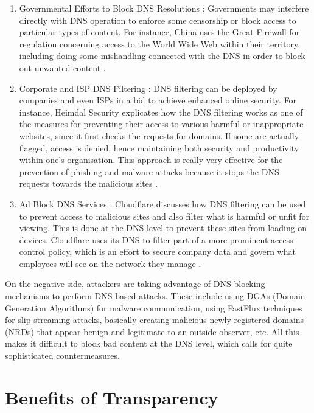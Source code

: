 \begin{enumerate}
    \item Governmental Efforts to Block DNS Resolutions : Governments may interfere directly with DNS operation to enforce some censorship or block access to particular types of content. For instance, China uses the Great Firewall for regulation concerning access to the World Wide Web within their territory, including doing some mishandling connected with the DNS in order to block out unwanted content \cite{XuAlbert2017MediaCensorship}.
    \item Corporate and ISP DNS Filtering : DNS filtering can be deployed by companies and even ISPs in a bid to achieve enhanced online security. For instance, Heimdal Security explicates how the DNS filtering works as one of the measures for preventing their access to various harmful or inappropriate websites, since it first checks the requests for domains. If some are actually flagged, access is denied, hence maintaining both security and productivity within one's organisation. This approach is really very effective for the prevention of phishing and malware attacks because it stops the DNS requests towards the malicious sites \cite{
HeimdalDNSSecurity2023}.
    \item Ad Block DNS Services : Cloudflare discusses how DNS filtering can be used to prevent access to malicious sites and also filter what is harmful or unfit for viewing. This is done at the DNS level to prevent these sites from loading on devices. Cloudflare uses its DNS to filter part of a more prominent access control policy, which is an effort to secure company data and govern what employees will see on the network they manage \cite{CloudflareDNSFiltering2023} .   
\end{enumerate}

 On the negative side, attackers are taking advantage of DNS blocking mechanisms to perform DNS-based attacks. These include using DGAs (Domain Generation Algorithms) for malware communication, using FastFlux techniques for slip-streaming attacks, basically creating malicious newly registered domains (NRDs) that appear benign and legitimate to an outside observer, etc. All this makes it difficult to block bad content at the DNS level, which calls for quite sophisticated countermeasures.


\section{Benefits of Transparency }


